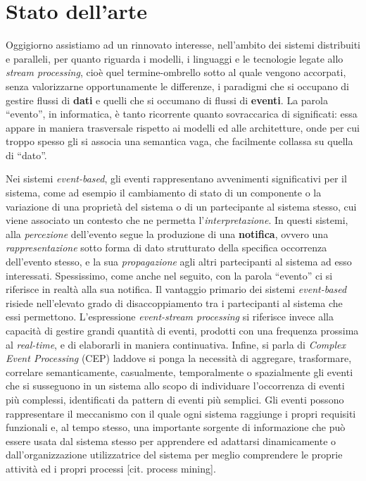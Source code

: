 \section{Stato dell'arte}\label{stato-dellarte}

Oggigiorno assistiamo ad un rinnovato interesse, nell'ambito dei sistemi
distribuiti e paralleli, per quanto riguarda i modelli, i linguaggi e le
tecnologie legate allo \emph{stream processing}, cioè quel
termine-ombrello sotto al quale vengono accorpati, senza valorizzarne
opportunamente le differenze, i paradigmi che si occupano di gestire
flussi di \textbf{dati} e quelli che si occumano di flussi di
\textbf{eventi}. La parola ``evento'', in informatica, è tanto
ricorrente quanto sovraccarica di significati: essa appare in maniera
trasversale rispetto ai modelli ed alle architetture, onde per cui
troppo spesso gli si associa una semantica vaga, che facilmente collassa
su quella di ``dato''.

Nei sistemi \emph{event-based}, gli eventi rappresentano avvenimenti
significativi per il sistema, come ad esempio il cambiamento di stato di
un componente o la variazione di una proprietà del sistema o di un
partecipante al sistema stesso, cui viene associato un contesto che ne
permetta l'\emph{interpretazione}. In questi sistemi, alla
\emph{percezione} dell'evento segue la produzione di una
\textbf{notifica}, ovvero una \emph{rappresentazione} sotto forma di
dato strutturato della specifica occorrenza dell'evento stesso, e la sua
\emph{propagazione} agli altri partecipanti al sistema ad esso
interessati. Spessissimo, come anche nel seguito, con la parola
``evento'' ci si riferisce in realtà alla sua notifica. Il vantaggio
primario dei sistemi \emph{event-based} risiede nell'elevato grado di
disaccoppiamento tra i partecipanti al sistema che essi permettono.
L'espressione \emph{event-stream processing} si riferisce invece alla
capacità di gestire grandi quantità di eventi, prodotti con una
frequenza prossima al \emph{real-time}, e di elaborarli in maniera
continuativa. Infine, si parla di \emph{Complex Event Processing} (CEP)
laddove si ponga la necessità di aggregare, trasformare, correlare
semanticamente, casualmente, temporalmente o spazialmente gli eventi che
si susseguono in un sistema allo scopo di individuare l'occorrenza di
eventi più complessi, identificati da pattern di eventi più semplici.
Gli eventi possono rappresentare il meccanismo con il quale ogni sistema
raggiunge i propri requisiti funzionali e, al tempo stesso, una
importante sorgente di informazione che può essere usata dal sistema
stesso per apprendere ed adattarsi dinamicamente o dall'organizzazione
utilizzatrice del sistema per meglio comprendere le proprie attività ed
i propri processi {[}cit. process mining{]}.

